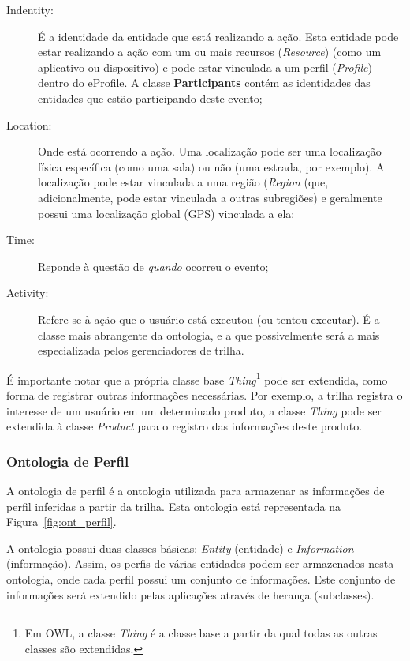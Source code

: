 \begin{description}

  \item[Indentity:] É a identidade da entidade que está realizando a ação. Esta entidade pode estar realizando a ação com um ou mais recursos ({\em Resource}) (como um aplicativo ou dispositivo) e pode estar vinculada a um perfil ({\em Profile}) dentro do eProfile. A classe \textbf{Participants} contém as identidades das entidades que estão participando deste evento;

  \item[Location:] Onde está ocorrendo a ação. Uma localização pode ser uma localização física específica (como uma sala) ou não (uma estrada, por exemplo). A localização pode estar vinculada a uma região ({\em Region} (que, adicionalmente, pode estar vinculada a outras subregiões) e geralmente possui uma localização global (GPS) vinculada a ela;

  \item[Time:] Reponde à questão de {\em quando} ocorreu o evento;

  \item[Activity:] Refere-se à ação que o usuário está executou (ou tentou executar). É a classe mais abrangente da ontologia, e a que possivelmente será a mais especializada pelos gerenciadores de trilha.

\end{description}

É importante notar que a própria classe base {\em Thing}\footnote{Em OWL, a classe {\em Thing} é a classe base a partir da qual todas as outras classes são extendidas.} pode ser extendida, como forma de registrar outras informações necessárias. Por exemplo, a trilha registra o interesse de um usuário em um determinado produto, a classe {\em Thing} pode ser extendida à classe {\em Product} para o registro das informações deste produto.


\subsubsection{Ontologia de Perfil}

A ontologia de perfil é a ontologia utilizada para armazenar as informações de perfil inferidas a partir da trilha. Esta ontologia está representada na Figura~\ref{fig:ont_perfil}.

A ontologia possui duas classes básicas: {\em Entity} (entidade) e {\em Information} (informação). Assim, os perfis de várias entidades podem ser armazenados nesta ontologia, onde cada perfil possui um conjunto de informações. Este conjunto de informações será extendido pelas aplicações através de herança (subclasses). 

